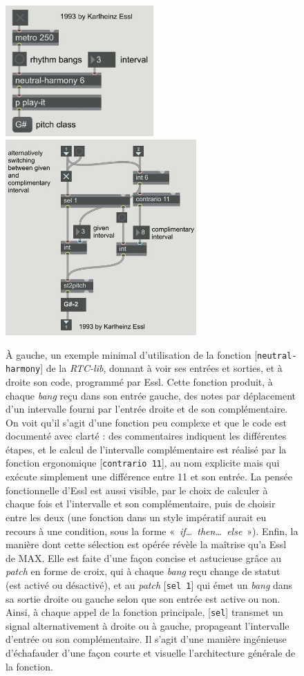 \documentclass[a4paper,12pt]{article}
\newcommand{\guill}[1]{«~#1~»}
\newcommand{\patch}[1]{[\texttt{#1}]}
\begin{document}
\begin{figure}[!h]
\begin{center}
\includegraphics[height=5cm]{images/capot1.jpg}~~~~~
\includegraphics[height=7.5cm]{images/capot2.jpg}
\caption{\footnotesize À gauche, un exemple minimal d'utilisation de la fonction \patch{neutral-harmony} de la \emph{RTC-lib}, donnant à voir ses entrées et sorties, et à droite son code, programmé par Essl. Cette fonction produit, à chaque \emph{bang} reçu dans son entrée gauche, des notes par déplacement d'un intervalle fourni par l'entrée droite et de son complémentaire. On voit qu'il s'agit d'une fonction peu complexe et que le code est documenté avec clarté : des commentaires indiquent les différentes étapes, et le calcul de l'intervalle complémentaire est réalisé par la fonction ergonomique \patch{contrario~11}, au nom explicite mais qui exécute simplement une différence entre 11 et son entrée. La pensée fonctionnelle d'Essl est aussi visible, par le choix de calculer à chaque fois et l'intervalle et son complémentaire, puis de choisir entre les deux (une fonction dans un style impératif aurait eu recours à une condition, sous la forme \guill{\emph{if\dots~then\dots~else}}). Enfin, la manière dont cette sélection est opérée révèle la maîtrise qu'a Essl de MAX. Elle est faite d'une façon concise et astucieuse grâce au \emph{patch} en forme de croix, qui à chaque \emph{bang} reçu change de statut (est activé ou désactivé), et au \emph{patch} \patch{sel~1} qui émet un \emph{bang} dans sa sortie droite ou gauche selon que son entrée est active ou non. Ainsi, à chaque appel de la fonction principale, \patch{sel} transmet un signal alternativement à droite ou à gauche, propageant l'intervalle d'entrée ou son complémentaire. Il s'agit d'une manière ingénieuse d'échafauder d'une façon courte et visuelle l'architecture générale de la fonction.}
\label{capot}
\end{center}
\end{figure}
\end{document}
